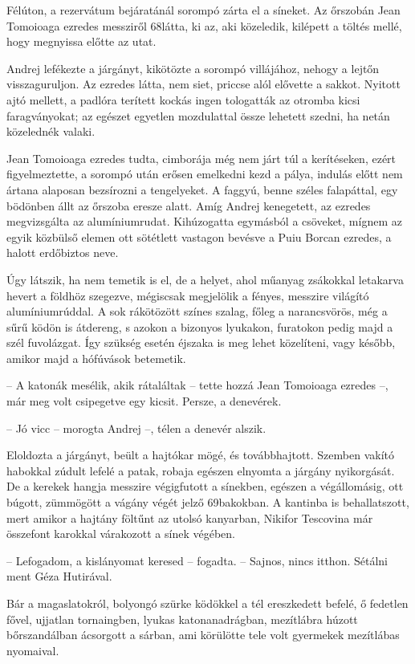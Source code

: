 \documentclass{IEEEtran}
\begin{document}
Félúton, a rezervátum bejáratánál sorompó zárta el a síneket. Az őrszobán Jean
Tomoioaga ezredes messziről 68látta, ki az, aki közeledik, kilépett a töltés
mellé, hogy megnyissa előtte az utat.

Andrej lefékezte a járgányt, kikötözte a sorompó villájához, nehogy a lejtőn
visszaguruljon. Az ezredes látta, nem siet, priccse alól elővette a sakkot.
Nyitott ajtó mellett, a padlóra terített kockás ingen tologatták az otromba
kicsi faragványokat; az egészet egyetlen mozdulattal össze lehetett szedni, ha
netán közelednék valaki.

Jean Tomoioaga ezredes tudta, cimborája még nem járt túl a kerítéseken, ezért
figyelmeztette, a sorompó után erősen emelkedni kezd a pálya, indulás előtt
nem ártana alaposan bezsírozni a tengelyeket. A faggyú, benne széles
falapáttal, egy bödönben állt az őrszoba eresze alatt. Amíg Andrej kenegetett,
az ezredes megvizsgálta az alumíniumrudat. Kihúzogatta egymásból a csöveket,
mígnem az egyik közbülső elemen ott sötétlett vastagon bevésve a Puiu Borcan
ezredes, a halott erdőbiztos neve.

Úgy látszik, ha nem temetik is el, de a helyet, ahol műanyag zsákokkal
letakarva hevert a földhöz szegezve, mégiscsak megjelölik a fényes, messzire
világító alumíniumrúddal. A sok rákötözött színes szalag, főleg a
narancsvörös, még a sűrű ködön is átdereng, s azokon a bizonyos lyukakon,
furatokon pedig majd a szél fuvolázgat. Így szükség esetén éjszaka is meg
lehet közelíteni, vagy később, amikor majd a hófúvások betemetik.

– A katonák mesélik, akik rátaláltak – tette hozzá Jean Tomoioaga ezredes –,
már meg volt csipegetve egy kicsit. Persze, a denevérek.

– Jó vicc – morogta Andrej –, télen a denevér alszik.

Eloldozta a járgányt, beült a hajtókar mögé, és továbbhajtott. Szemben vakító
habokkal zúdult lefelé a patak, robaja egészen elnyomta a járgány nyikorgását.
De a kerekek hangja messzire végigfutott a sínekben, egészen a végállomásig,
ott búgott, zümmögött a vágány végét jelző 69bakokban. A kantinba is
behallatszott, mert amikor a hajtány föltűnt az utolsó kanyarban, Nikifor
Tescovina már összefont karokkal várakozott a sínek végében.

– Lefogadom, a kislányomat keresed – fogadta. – Sajnos, nincs itthon. Sétálni
ment Géza Hutirával.

Bár a magaslatokról, bolyongó szürke ködökkel a tél ereszkedett befelé, ő
fedetlen fővel, ujjatlan tornaingben, lyukas katonanadrágban, mezítlábra
húzott bőrszandálban ácsorgott a sárban, ami körülötte tele volt gyermekek
mezítlábas nyomaival.
\end{document}
